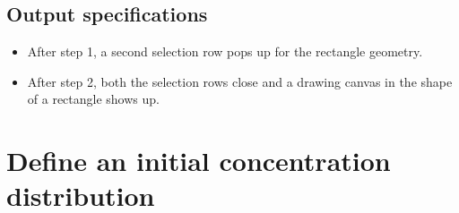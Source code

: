 \subsection*{Output specifications}
\begin{itemize}
\item After step 1, a second selection row pops up for the rectangle geometry.
\item After step 2, both the selection rows close and a drawing canvas in the shape of a rectangle shows up.
\end{itemize}

 
\section{Define an initial concentration distribution}

